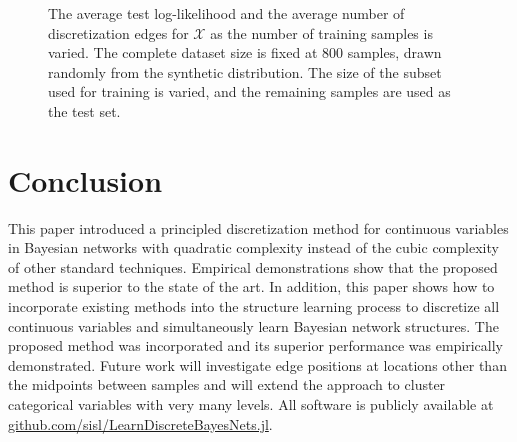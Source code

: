 \documentclass[twoside,11pt]{article}
\newcommand{\cX}{\mathcal{X}} %
\begin{document}
\begin{figure}
	\begin{subfigure}{0.45\textwidth}
		\centering
		\scalebox{0.6}{}
	\end{subfigure}%
	\begin{subfigure}{0.45\textwidth}
		\centering
		\scalebox{0.6}{}
	\end{subfigure}

	\caption{The average test log-likelihood and the average number of discretization edges for $\cX$ as the number of training samples is varied.
  The complete dataset size is fixed at \num{800} samples, drawn randomly from the synthetic distribution.
  The size of the subset used for training is varied, and the remaining samples are used as the test set.
  }
	\label{fig:synthetic}
\end{figure}

\section{Conclusion}
This paper introduced a principled discretization method for continuous variables in Bayesian networks with quadratic complexity instead of the cubic complexity of other standard techniques.
Empirical demonstrations show that the proposed method is superior to the state of the art.
In addition, this paper shows how to incorporate existing methods into the structure learning process to discretize all continuous variables and simultaneously learn Bayesian network structures.
The proposed method was incorporated and its superior performance was empirically demonstrated.
Future work will investigate edge positions at locations other than the midpoints between samples and will extend the approach to cluster categorical variables with very many levels.
All software is publicly available at \url{github.com/sisl/LearnDiscreteBayesNets.jl}.


\end{document}
